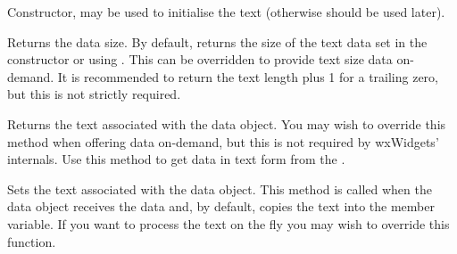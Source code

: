 
Constructor, may be used to initialise the text (otherwise 
 should be used later).

\label{wxtextdataobjectgettextlength}


Returns the data size. By default, returns the size of the text data
set in the constructor or using .
This can be overridden to provide text size data on-demand. It is recommended
to return the text length plus 1 for a trailing zero, but this is not
strictly required.

\label{wxtextdataobjectgettext}


Returns the text associated with the data object. You may wish to override
this method when offering data on-demand, but this is not required by
wxWidgets' internals. Use this method to get data in text form from
the .

\label{wxtextdataobjectsettext}


Sets the text associated with the data object. This method is called
when the data object receives the data and, by default, copies the text into
the member variable. If you want to process the text on the fly you may wish to
override this function.

